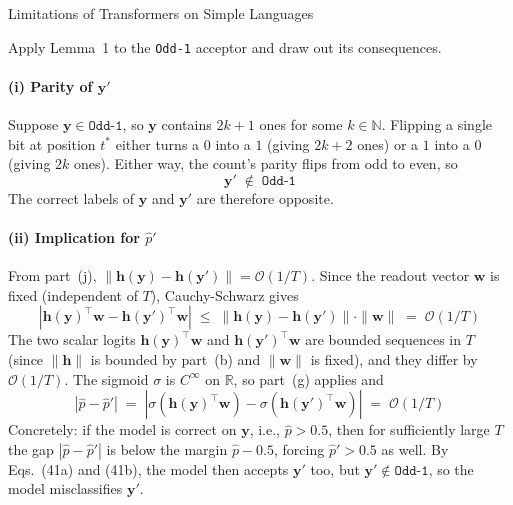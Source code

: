 \begin{question}{Limitations of Transformers on Simple Languages}
\begin{subquestion}
    Apply Lemma~1 to the \texttt{Odd-1} acceptor and draw out its consequences.

    \paragraph{(i) Parity of $\mathbf{y}'$}
    Suppose $\mathbf{y} \in \texttt{Odd-1}$, so $\mathbf{y}$ contains $2k+1$ ones for some $k \in \mathbb{N}$. 
    Flipping a single bit at position $t^*$ either turns a $0$ into a $1$ (giving $2k+2$ ones) or a $1$ into a $0$ (giving $2k$ ones). 
    Either way, the count's parity flips from odd to even, so
    \begin{equation*}
        \mathbf{y}' \;\notin\; \texttt{Odd-1}
    \end{equation*}
    The correct labels of $\mathbf{y}$ and $\mathbf{y}'$ are therefore opposite.

    \paragraph{(ii) Implication for $\hat{p}'$}
    From part~(j), $\|\mathbf{h}(\mathbf{y}) - \mathbf{h}(\mathbf{y}')\| = \mathcal{O}(1/T)$. 
    Since the readout vector $\mathbf{w}$ is fixed (independent of $T$), Cauchy-Schwarz gives
    \begin{equation*}
        |\mathbf{h}(\mathbf{y})^{\top} \mathbf{w} - \mathbf{h}(\mathbf{y}')^{\top} \mathbf{w}| \;\le\; \|\mathbf{h}(\mathbf{y}) - \mathbf{h}(\mathbf{y}')\| \cdot \|\mathbf{w}\| \;=\; \mathcal{O}(1/T)
    \end{equation*}
    The two scalar logits $\mathbf{h}(\mathbf{y})^{\top}\mathbf{w}$ and $\mathbf{h}(\mathbf{y}')^{\top}\mathbf{w}$ are bounded sequences in $T$ (since $\|\mathbf{h}\|$ is bounded by part~(b) and $\|\mathbf{w}\|$ is fixed), and they differ by $\mathcal{O}(1/T)$. 
    The sigmoid $\sigma$ is $C^{\infty}$ on $\mathbb{R}$, so part~(g) applies and
    \begin{equation*}
        |\hat{p} - \hat{p}'| \;=\; |\sigma(\mathbf{h}(\mathbf{y})^{\top}\mathbf{w}) - \sigma(\mathbf{h}(\mathbf{y}')^{\top}\mathbf{w})| \;=\; \mathcal{O}(1/T)
    \end{equation*}
    Concretely: if the model is correct on $\mathbf{y}$, i.e., $\hat{p} > 0.5$, then for sufficiently large $T$ the gap $|\hat{p} - \hat{p}'|$ is below the margin $\hat{p} - 0.5$, forcing $\hat{p}' > 0.5$ as well. 
    By Eqs.~(41a) and (41b), the model then accepts $\mathbf{y}'$ too, but $\mathbf{y}' \notin \texttt{Odd-1}$, so the model misclassifies $\mathbf{y}'$.


\end{subquestion}
\end{question}
